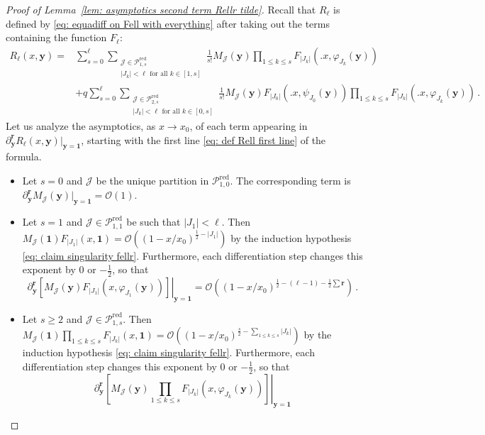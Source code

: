 \documentclass{article}
\theoremstyle{remark}
\newcommand{\cO}{\mathcal{O}}
\newcommand{\abs}[1]{{\left|#1\right|}}
\newcommand{\cJ}{\mathcal{J}}
\newcommand{\cP}{\mathcal{P}}
\newcommand{\by}{{\mathbf{y}}}
\newcommand{\br}{{\mathbf{r}}}
\newcommand{\red}{\mathrm{red}}
\begin{document}
\begin{proof}[Proof of Lemma~\ref{lem: asymptotics second term Rellr tilde}]
Recall that $R_{\ell}$ is defined by \eqref{eq: equadiff on Fell with everything} after taking out the terms containing the function $F_\ell$:
\begin{align}
    R_\ell(x,\by)
    = &\sum_{s=0}^\ell \sum_{\substack{\cJ\in \cP_{1,s}^\red \\ \abs{J_k}<\ell \text{ for all } k\in[1,s]}} \frac{1}{s!} 
    M_\cJ(\by)
    \prod_{1\le k\le s} F_{\abs{J_k}}\left(\big. x , \varphi_{J_k}(\by) \right) 
    \label{eq: def Rell first line}\\
    &+ q \sum_{s=0}^\ell \sum_{\substack{\cJ\in \cP_{2,s}^\red \\ \abs{J_k}<\ell \text{ for all } k\in[0,s]}} \frac{1}{s!} 
    M_\cJ(\by)
    F_{\abs{J_0}}\left(\big. x , \psi_{J_0}(\by) \right)
    \prod_{1\le k\le s} F_{\abs{J_k}}\left(\big. x , \varphi_{J_k}(\by) \right) \,. 
    \label{eq: def Rell second line}
\end{align}
Let us analyze the asymptotics, as $x\to x_0$, of each term appearing in $\partial_\by^\br R_\ell(x,\by) \vert_{\by=\bm{1}}$, starting with the first line \eqref{eq: def Rell first line} of the formula.
\begin{itemize}
    \item Let $s=0$ and $\cJ$ be the unique partition in $\cP_{1,0}^\red$.
    The corresponding term is $\partial_\by^\br M_\cJ(\by) \vert_{\by=\bm{1}} = \cO(1)$.
    \item Let $s=1$ and $\cJ\in\cP_{1,1}^\red$ be such that $\abs{J_1}<\ell$.
    Then $M_\cJ(\bm{1}) F_{\abs{J_1}}(x,\bm{1}) = \cO\left( (1-x/x_0)^{\frac12-\abs{J_1}} \right)$ by the induction hypothesis \eqref{eq: claim singularity fellr}.
    Furthermore, each differentiation step changes this exponent by $0$ or $-\frac12$, so that
    \[
        \partial_\by^\br \left. \left[ M_\cJ(\by) F_{\abs{J_1}}\left( x,\varphi_{J_1}(\by) \right) \right] \right\vert_{\by=\bm{1}} 
        = \cO\left( (1-x/x_0)^{\frac12-(\ell-1)-\frac12\sum\br} \right) \,.
    \]
    \item Let $s\ge2$ and $\cJ\in\cP_{1,s}^\red$.
    Then $M_\cJ(\bm{1}) \prod_{1\le k\le s} F_{\abs{J_k}}(x,\bm{1}) = \cO\left( (1-x/x_0)^{\frac{s}{2}-\sum_{1\le k\le s}\abs{J_k}} \right)$ by the induction hypothesis \eqref{eq: claim singularity fellr}.
    Furthermore, each differentiation step changes this exponent by $0$ or $-\frac12$, so that
    \[
        \partial_\by^\br \left. \left[ M_\cJ(\by) \prod_{1\le k\le s} F_{\abs{J_k}}\left( x,\varphi_{J_k}(\by) \right) \right] \right\vert_{\by=\bm{1}} 
\]
\end{itemize}
\end{proof}
\end{document}
